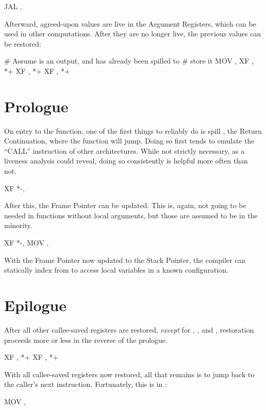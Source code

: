 \startblock
	JAL , 
\endblock

Afterward, agreed-upon values are live in the Argument Registers, which can be
used in other computations. After they are no longer live, the previous values
can be restored:

\startblock
	\# Assume  is an output, and  has already been spilled to
	\# store it
	MOV , 
	XF , *+
	XF , *+
	XF , *+
\endblock

\section{Prologue}

On entry to the function, one of the first things to reliably do is spill
, the Return Continuation, where the function will jump. Doing so first
tends to emulate the ``CALL'' instruction of other architectures. While not
strictly necessary, as a liveness analysis could reveal, doing so consistently
is helpful more often than not.

\startblock
	XF *-, 
\endblock

After this, the Frame Pointer  can be updated. This is, again, not
going to be needed in functions without local arguments, but those are assumed
to be in the minority.

\startblock
	XF *-, 
	MOV , 
\endblock

With the Frame Pointer now updated to the Stack Pointer, the compiler can
statically index from  to access local variables in a known
configuration.

\section{Epilogue}

After all other callee-saved registers are restored, {\it except} for ,
, and , restoration proceeds more or less in the reverse of the
prologue.

\startblock
	XF , *+
	XF , *+
\endblock

With all callee-saved registers now restored, all that remains is to jump back
to the caller's next instruction. Fortunately, this is in :

\startblock
	MOV , 
\endblock

\maybye

